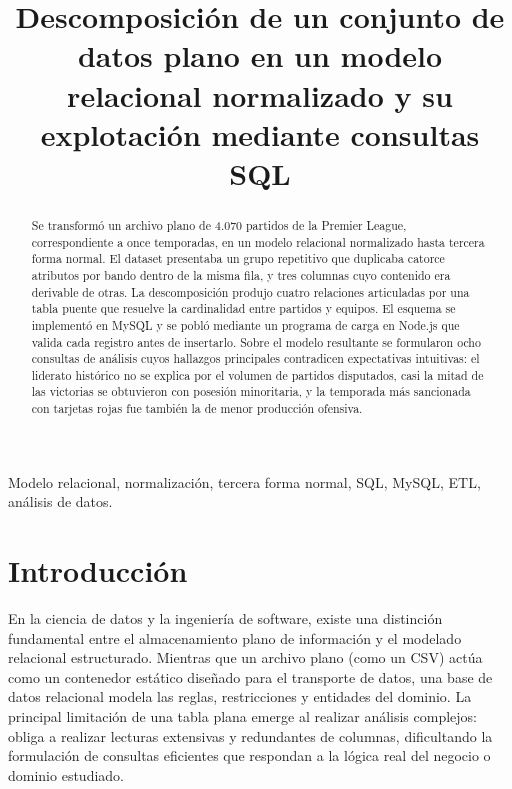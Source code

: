 \documentclass[conference]{IEEEtran}
\begin{document}
\title{Descomposición de un conjunto de datos plano en un modelo
relacional normalizado y su explotación mediante consultas SQL}

\author{
}

\maketitle

\begin{abstract}
Se transformó un archivo plano de 4.070 partidos de la Premier League,
correspondiente a once temporadas, en un modelo relacional normalizado hasta
tercera forma normal. El dataset presentaba un grupo repetitivo que duplicaba
catorce atributos por bando dentro de la misma fila, y tres columnas cuyo
contenido era derivable de otras. La descomposición produjo cuatro relaciones
articuladas por una tabla puente que resuelve la cardinalidad entre partidos y
equipos. El esquema se implementó en MySQL y se pobló mediante un programa de
carga en Node.js que valida cada registro antes de insertarlo. Sobre el modelo
resultante se formularon ocho consultas de análisis cuyos hallazgos principales
contradicen expectativas intuitivas: el liderato histórico no se explica por el
volumen de partidos disputados, casi la mitad de las victorias se obtuvieron
con posesión minoritaria, y la temporada más sancionada con tarjetas rojas fue
también la de menor producción ofensiva.
\end{abstract}

\begin{IEEEkeywords}
Modelo relacional, normalización, tercera forma normal, SQL, MySQL, ETL,
análisis de datos.
\end{IEEEkeywords}

\section{Introducción}

En la ciencia de datos y la ingeniería de software, existe una distinción
fundamental entre el almacenamiento plano de información y el modelado
relacional estructurado. Mientras que un archivo plano (como un CSV) actúa como
un contenedor estático diseñado para el transporte de datos, una base de datos
relacional modela las reglas, restricciones y entidades del dominio. La
principal limitación de una tabla plana emerge al realizar análisis complejos:
obliga a realizar lecturas extensivas y redundantes de columnas, dificultando
la formulación de consultas eficientes que respondan a la lógica real del
negocio o dominio estudiado.
\end{document}
